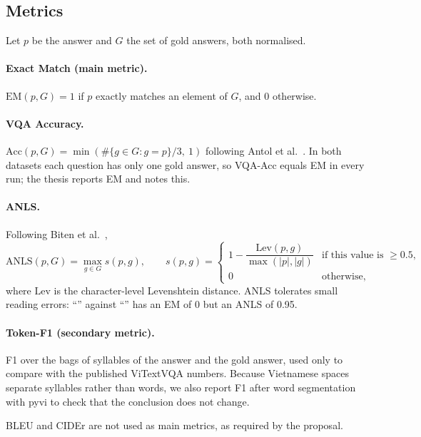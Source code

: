 \subsection{Metrics}

Let $p$ be the answer and $G$ the set of gold answers, both normalised.

\paragraph{Exact Match (main metric).} $\mathrm{EM}(p, G) = 1$ if $p$ exactly matches an
element of $G$, and 0 otherwise.

\paragraph{VQA Accuracy.}
$\mathrm{Acc}(p, G) = \min\left(\#\{g \in G : g = p\}/3,\ 1\right)$ following Antol et
al.~\cite{antol2015vqa}. In both datasets each question has only one gold answer, so
VQA-Acc equals EM in every run; the thesis reports EM and notes this.

\paragraph{ANLS.} Following Biten et al.~\cite{biten2019stvqa},
\begin{equation}
\mathrm{ANLS}(p, G) = \max_{g \in G} s(p, g), \qquad
s(p, g) =
\begin{cases}
1 - \dfrac{\mathrm{Lev}(p, g)}{\max(|p|, |g|)} & \text{if this value is } \geq 0.5,\\[6pt]
0 & \text{otherwise,}
\end{cases}
\label{eq:anls}
\end{equation}
where $\mathrm{Lev}$ is the character-level Levenshtein distance. ANLS tolerates small
reading errors: ``'' against ``'' has an EM of 0 but an ANLS of
0.95.

\paragraph{Token-F1 (secondary metric).} F1 over the bags of syllables of the answer and
the gold answer, used only to compare with the published ViTextVQA numbers. Because
Vietnamese spaces separate syllables rather than words, we also report F1 after
word segmentation with pyvi to check that the conclusion does not change.

BLEU and CIDEr are not used as main metrics, as required by the proposal.

